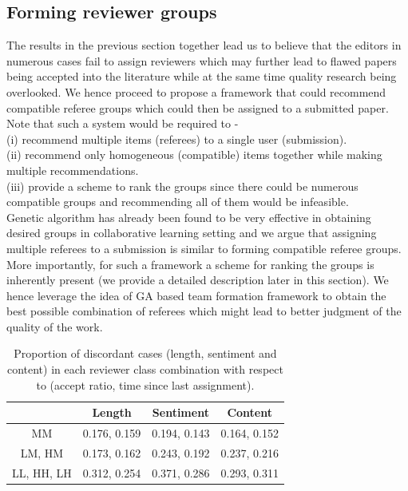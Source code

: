 \noindent
\subsection{Forming reviewer groups}
\label{group}

The results in the previous section together lead us to believe that the editors in numerous cases fail to assign reviewers which may further lead to flawed papers 
being accepted into the literature while at 
the same time quality research being overlooked. We hence proceed to propose a framework that could recommend compatible referee groups which could then be assigned to 
a submitted paper. 
Note that such a system would be required to - \\
(i) recommend multiple items (referees) to a single user (submission).\\ 
(ii) recommend only homogeneous (compatible) items together while making multiple recommendations. \\ 
(iii) provide a scheme to rank the groups since there could be numerous compatible groups and recommending all of them would be infeasible. \\
Genetic algorithm has already been found to be very effective in obtaining desired groups in collaborative learning setting \cite{moreno2012genetic,ani2010method} 
and we argue that assigning multiple referees to a submission is similar to forming 
compatible referee groups. More importantly, for such a framework a scheme for ranking the groups is inherently present (we provide a detailed description later in this section).   
We hence leverage the idea of GA based team formation framework to obtain the best possible combination of referees which might lead to better judgment of the quality 
of the work. 


\begin{table}
\centering
\caption{Proportion of discordant cases (length, sentiment and content) in each reviewer class combination with respect to (accept ratio, time since 
last assignment).\vspace{3mm} }
\label{tab:dis}
\begin{tabular}{c|c|c|c}
\hline
           & Length       & Sentiment    & Content      \\ \hline
MM         & 0.176, 0.159  & 0.194, 0.143 & 0.164, 0.152 \\ 
LM, HM     & 0.173, 0.162 & 0.243, 0.192 & 0.237, 0.216 \\ 
LL, HH, LH & 0.312, 0.254 & 0.371, 0.286 & 0.293, 0.311 \\ \hline
\end{tabular}
\vspace{4mm}
\end{table}

